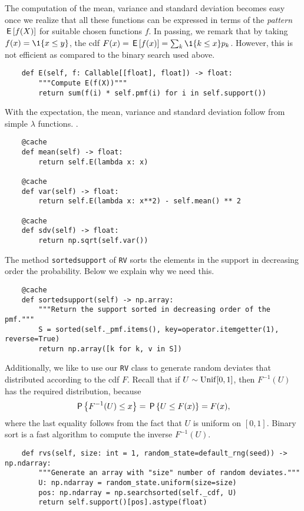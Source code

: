 \documentclass[stochastic-or]{subfiles}
\begin{document}
The computation of the mean, variance and standard deviation becomes easy once we realize that all these functions can be expressed in terms of the \emph{pattern} \(\E{f(X)}\) for suitable chosen functions \(f\).
In passing, we remark that by taking \(f(x) = \1{x\leq y}\), the cdf \(F(x) = \E{f(x)} = \sum_{k} \1{k \leq x} p_{k}\).
However, this is not efficient as compared to the binary search used above.
\begin{verbatim}
    def E(self, f: Callable[[float], float]) -> float:
        """Compute E(f(X))"""
        return sum(f(i) * self.pmf(i) for i in self.support())
\end{verbatim}

With the expectation, the mean, variance and standard deviation follow from simple \(\lambda\) functions. .
\begin{verbatim}
    @cache
    def mean(self) -> float:
        return self.E(lambda x: x)

    @cache
    def var(self) -> float:
        return self.E(lambda x: x**2) - self.mean() ** 2

    @cache
    def sdv(self) -> float:
        return np.sqrt(self.var())
\end{verbatim}

The method \texttt{sortedsupport} of \texttt{RV} sorts the elements in the support in decreasing order the probability. Below we explain why we need this.
\begin{verbatim}
    @cache
    def sortedsupport(self) -> np.array:
        """Return the support sorted in decreasing order of the pmf."""
        S = sorted(self._pmf.items(), key=operator.itemgetter(1), reverse=True)
        return np.array([k for k, v in S])
\end{verbatim}


Additionally, we like to use our \texttt{RV} class to generate random deviates that distributed according to the cdf \(F\).
Recall that if \(U\sim \Unif{[0,1]}\), then \(F^{-1}(U)\) has the required distribution, because
\begin{equation*}
\P{F^{-1}(U) \leq x} = \P{U \leq F(x)} = F(x),
\end{equation*}
where the last equality follows from the fact that \(U\) is uniform on \([0,1]\).
Binary sort is a fast algorithm to compute the inverse \(F^{-1}(U)\).
\begin{verbatim}
    def rvs(self, size: int = 1, random_state=default_rng(seed)) -> np.ndarray:
        """Generate an array with "size" number of random deviates."""
        U: np.ndarray = random_state.uniform(size=size)
        pos: np.ndarray = np.searchsorted(self._cdf, U)
        return self.support()[pos].astype(float)
\end{verbatim}
\end{document}
